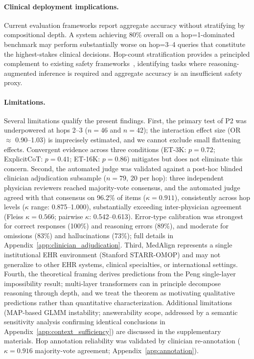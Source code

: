 \documentclass{article}
\begin{document}
\paragraph{Clinical deployment implications.}
Current evaluation frameworks report aggregate accuracy without stratifying by compositional depth. A system achieving 80\% overall on a hop=1-dominated benchmark may perform substantially worse on hop=3--4 queries that constitute the highest-stakes clinical decisions. Hop-count stratification provides a principled complement to existing safety frameworks~\citep{noharm2025}, identifying tasks where reasoning-augmented inference is required and aggregate accuracy is an insufficient safety proxy.

\paragraph{Limitations.}
Several limitations qualify the present findings. First, the primary test of P2 was underpowered at hops 2--3 ($n = 46$ and $n = 42$); the interaction effect size (OR $\approx$ 0.90--1.03) is imprecisely estimated, and we cannot exclude small flattening effects. Convergent evidence across three conditions (ET-3K: $p = 0.72$; ExplicitCoT: $p = 0.41$; ET-16K: $p = 0.86$) mitigates but does not eliminate this concern. Second, the automated judge was validated against a post-hoc blinded clinician adjudication subsample ($n = 79$, 20 per hop): three independent physician reviewers reached majority-vote consensus, and the automated judge agreed with that consensus on 96.2\% of items ($\kappa = 0.911$), consistently across hop levels ($\kappa$ range: 0.875--1.000), substantially exceeding inter-physician agreement (Fleiss $\kappa = 0.566$; pairwise $\kappa$: 0.542--0.613). Error-type calibration was strongest for correct responses (100\%) and reasoning errors (89\%), and moderate for omissions (83\%) and hallucinations (73\%); full details in Appendix~\ref{app:clinician_adjudication}. Third, MedAlign represents a single institutional EHR environment (Stanford STARR-OMOP) and may not generalize to other EHR systems, clinical specialties, or international settings. Fourth, the theoretical framing derives predictions from the Peng single-layer impossibility result; multi-layer transformers can in principle decompose reasoning through depth, and we treat the theorem as motivating qualitative predictions rather than quantitative characterization. Additional limitations (MAP-based GLMM instability; answerability scope, addressed by a semantic sensitivity analysis confirming identical conclusions in Appendix~\ref{app:context_sufficiency}) are discussed in the supplementary materials. Hop annotation reliability was validated by clinician re-annotation ($\kappa = 0.916$ majority-vote agreement; Appendix~\ref{app:annotation}).
\end{document}

